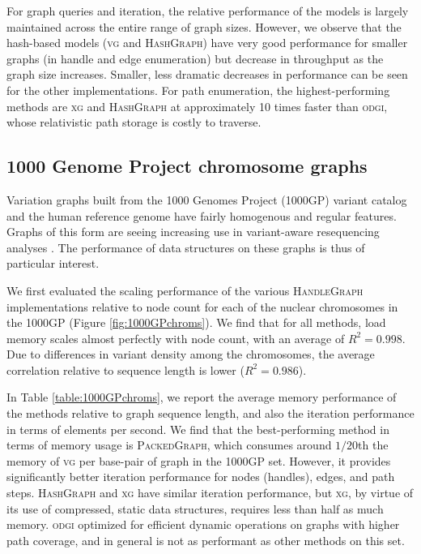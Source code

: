 \documentclass{article}
\begin{document}
For graph queries and iteration, the relative performance of the models is largely maintained across the entire range of graph sizes.
However, we observe that the hash-based models (\textsc{vg} and \textsc{HashGraph}) have very good performance for smaller graphs (in handle and edge enumeration) but decrease in throughput as the graph size increases.
Smaller, less dramatic decreases in performance can be seen for the other implementations.
For path enumeration, the highest-performing methods are \textsc{xg} and \textsc{HashGraph} at approximately 10 times faster than \textsc{odgi}, whose relativistic path storage is costly to traverse.

\subsection{1000 Genome Project chromosome graphs}

Variation graphs built from the 1000 Genomes Project (1000GP) variant catalog and the human reference genome have fairly homogenous and regular features.
Graphs of this form are seeing increasing use in variant-aware resequencing analyses \cite{crysnanto2019sequence}.
The performance of data structures on these graphs is thus of particular interest.

We first evaluated the scaling performance of the various \textsc{HandleGraph} implementations relative to node count for each of the nuclear chromosomes in the 1000GP (Figure \ref{fig:1000GPchroms}).
We find that for all methods, load memory scales almost perfectly with node count, with an average of $R^2 = 0.998$.
Due to differences in variant density among the chromosomes, the average correlation relative to sequence length is lower ($R^2 = 0.986$).

In Table \ref{table:1000GPchroms}, we report the average memory performance of the methods relative to graph sequence length, and also the iteration performance in terms of elements per second.
We find that the best-performing method in terms of memory usage is \textsc{PackedGraph}, which consumes around $1/20$th the memory of \textsc{vg} per base-pair of graph in the 1000GP set.
However, it provides significantly better iteration performance for nodes (handles), edges, and path steps.
\textsc{HashGraph} and \textsc{xg} have similar iteration performance, but \textsc{xg}, by virtue of its use of compressed, static data structures, requires less than half as much memory.
\textsc{odgi} optimized for efficient dynamic operations on graphs with higher path coverage, and in general is not as performant as other methods on this set.
\end{document}
